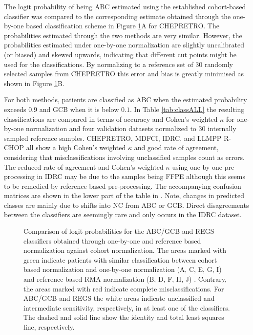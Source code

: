 \documentclass[10pt,letterpaper]{article}
\begin{document}
The logit probability of being ABC estimated using the established cohort-based classifier was compared to the corresponding estimate obtained through the one-by-one based classification scheme in Figure \ref{fig:ABCGCBDrug}A for CHEPRETRO.
The probabilities estimated through the two methods are very similar.
However, the probabilities estimated under one-by-one normalization are slightly uncalibrated (or biased) and skewed upwards, indicating that different cut points might be used for the classifications.
By normalizing to a reference set of $30$ randomly selected samples from CHEPRETRO this error and bias is greatly minimised as shown in Figure \ref{fig:ABCGCBDrug}B.

For both methods, patients are classified as ABC when the estimated probability exceeds $0.9$ and GCB when it is below $0.1$.
In Table \ref{tab:classALL} the resulting classifications are compared in terms of accuracy and Cohen's weighted $\kappa$ for one-by-one normalization and four validation datasets normalized to 30 internally sampled reference samples.
CHEPRETRO, MDFCI, IDRC, and LLMPP R-CHOP all show a high Cohen's weighted $\kappa$ and good rate of agreement, considering that misclassifications involving unclassified samples count as errors.
The reduced rate of agreement and Cohen's weighted $\kappa$ using one-by-one pre-processing in IDRC may be due to the samples being FFPE although this seems to be remedied by reference based pre-processing.
The accompanying confusion matrices are shown in the lower part of the table in .
Note, changes in predicted classes are mainly due to shifts into NC from ABC or GCB.
Direct disagreements between the classifiers are seemingly rare and only occurs in the IDRC dataset.



\begin{figure}[!ht]
\caption{
Comparison of logit probabilities for the ABC/GCB and REGS classifiers obtained through one-by-one and reference based normalization against cohort normalization.
The areas marked with green indicate patients with similar classification between cohort based normalization and one-by-one normalization (A, C, E, G, I)  and reference based RMA normalization (B, D, F, H, J) .
Contrary, the areas marked with red indicate complete misclassifications.
For ABC/GCB and REGS the white areas indicate unclassified and intermediate sensitivity, respectively, in at least one of the classifiers.
The dashed and solid line show the identity and total least squares line, respectively.
}
\label{fig:ABCGCBDrug}
\end{figure}
\end{document}
